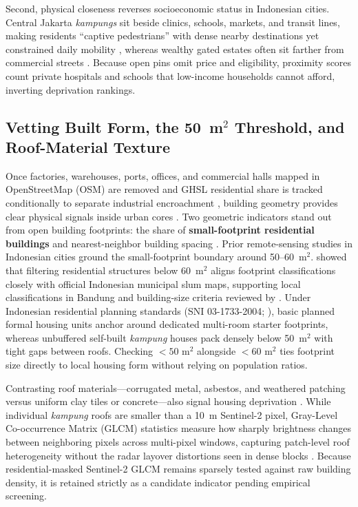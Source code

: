 Second, physical closeness reverses socioeconomic status in Indonesian cities. Central Jakarta \textit{kampungs} sit beside clinics, schools, markets, and transit lines, making residents ``captive pedestrians'' with dense nearby destinations yet constrained daily mobility \citep{Hidayati2020}, whereas wealthy gated estates often sit farther from commercial streets \citep{Firman2004}. Because open pins omit price and eligibility, proximity scores count private hospitals and schools that low-income households cannot afford, inverting deprivation rankings.

\subsection{Vetting Built Form, the \texorpdfstring{50~m$^2$}{50 m2} Threshold, and Roof-Material Texture}
Once factories, warehouses, ports, offices, and commercial halls mapped in OpenStreetMap (OSM) are removed and GHSL residential share is tracked conditionally to separate industrial encroachment \citep{Pesaresi2024}, building geometry provides clear physical signals inside urban cores \citep{Abascal2022b, Jochem2021b, Kuffer2016}. Two geometric indicators stand out from open building footprints: the share of \textbf{small-footprint residential buildings} and nearest-neighbor building spacing \citep{Jochem2021, Taubenbock2018}. Prior remote-sensing studies in Indonesian cities ground the small-footprint boundary around 50--60~m$^2$. \citet{Najmi2022} showed that filtering residential structures below 60~m$^2$ aligns footprint classifications closely with official Indonesian municipal slum maps, supporting local classifications in Bandung \citep{Leonita2018} and building-size criteria reviewed by \citet{Kuffer2016}. Under Indonesian residential planning standards (SNI 03-1733-2004; \citealt{SNI2004}), basic planned formal housing units anchor around dedicated multi-room starter footprints, whereas unbuffered self-built \textit{kampung} houses pack densely below 50~m$^2$ with tight gaps between roofs. Checking $<50\text{ m}^2$ alongside $<60\text{ m}^2$ ties footprint size directly to local housing form without relying on population ratios.

Contrasting roof materials---corrugated metal, asbestos, and weathered patching versus uniform clay tiles or concrete---also signal housing deprivation \citep{Kuffer2016, Kuffer2016b, Wurm2017}. While individual \textit{kampung} roofs are smaller than a 10~m Sentinel-2 pixel, Gray-Level Co-occurrence Matrix (GLCM) statistics measure how sharply brightness changes between neighboring pixels across multi-pixel windows, capturing patch-level roof heterogeneity \citep{deMattos2021, Wurm2017b} without the radar layover distortions seen in dense blocks \citep{Wurm2017}. Because residential-masked Sentinel-2 GLCM remains sparsely tested against raw building density, it is retained strictly as a candidate indicator pending empirical screening.

